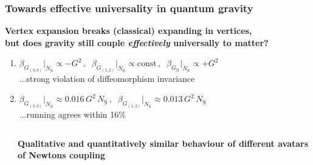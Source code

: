 \documentclass[]{beamer}  %
\newcommand\NS{ N_{\scriptscriptstyle{\mathrm{S}}} }
\newcommand\GNewton{ G_{\scriptscriptstyle{\mathrm{N}}}{} }
\begin{document}
\begin{frame}
  \frametitle{Towards effective universality in quantum gravity}

  \begin{center}
    \textbf{
      Vertex expansion breaks (classical) expanding in vertices,\\
      but does gravity still couple \textit{effectively} universally to matter?
    }
  \end{center}

  \begin{enumerate}
    \item
      {\makebox[95pt]
        {$\boxed{ \eta_h \big|_{\NS} = 0 }$}
        {$\beta_{G_{(3,0)}}\Big|_{\NS} \propto -G^2 \,, \;\;
          \beta_{G_{(1,2)}}\Big|_{\NS} \propto \mathrm{const} \,, \;\;
      \beta_{\GNewton}\Big|_{\NS}  \propto +G^2$}}\\
      \fontsize{6pt}{7.2}\selectfont
      \hfill ...strong violation of diffeomorphism invariance
      \fontsize{8pt}{7.2}\selectfont

      \vspace{5pt}
    \item
      {\makebox[95pt]
        {$\boxed{ \eta_h \big|_{\NS} = G_{(1,2)} \, \frac{\NS}{24 \pi} }$}
        {$\beta_{G_{(3,0)}}\Big|_{\NS}  \approx 0.016 \, G^2 \, \NS \,, \;\;
      \beta_{G_{(1,2)}} \Big|_{\NS} \approx 0.013 \, G^2 \, \NS$}}\\
      \fontsize{6pt}{7.2}\selectfont
      \hfill ...running agrees within 16\%
      \fontsize{8pt}{7.2}\selectfont
  \end{enumerate}

  \vspace{-15pt}
  \begin{columns}[T]
    \begin{column}{.8\textwidth}
      \begin{center}
      
    \end{center}
    \end{column}

    \hspace{-55pt}
    \begin{column}{.3\textwidth}
      \vspace{50pt}
      \begin{center}
        \textbf{
          Qualitative and quantitatively similar behaviour of different avatars
          of Newtons coupling
        }
      \end{center}
    \end{column}
  \end{columns}
\end{frame}
\end{document}
